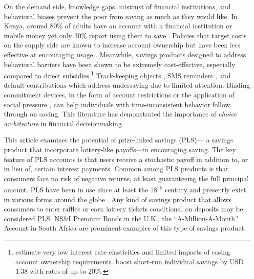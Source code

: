 \documentclass[11pt]{article}
\begin{document}
	On the demand side, knowledge gaps, mistrust of financial institutions, and behavioral biases prevent the poor from saving as much as they would like. In Kenya, around 80\% of adults have an account with a financial institution or mobile money yet only 30\% report using them to save \parencite{demirguc-kunt_global_2018}. Policies that target costs on the supply side are known to increase account ownership but have been less effective at encouraging usage \parencite{dupas_why_2013,karlan_banking_2016}. Meanwhile, savings products designed to address behavioral barriers have been shown to be extremely cost-effective, especially compared to direct subsidies.\footnote{\textcite{karlan_price_2018} estimate very low interest rate elasticities and limited impacts of easing account ownership requirements. \textcite{schaner_persistent_2018} boost short-run individual savings by USD 1.38 with rates of up to 20\%.} Track-keeping objects \parencite{akbas_how_2016}, SMS reminders \parencite{karlan_getting_2010}, and default contributions \parencite{thaler_save_2004,chetty_active_2014,somville_saving_2018} which address undersaving due to limited attention. Binding commitment devices, in the form of account restrictions \parencite{ashraf_tying_2006} or the application of social pressure \parencite{dupas_why_2013}, can help individuals with time-inconsistent behavior follow through on saving. This literature has demonstrated the importance of \textit{choice architecture} in financial decisionmaking.

	This article examines the potential of prize-linked savings (PLS)--- a savings product that incorporate lottery-like payoffs---in encouraging saving. The key feature of PLS accounts is that users receive a stochastic payoff in addition to, or in lieu of, certain interest payments. Common among PLS products is that consumers face no risk of negative returns, at least guaranteeing the full principal amount. PLS have been in use since at least the 18\textsuperscript{th} century and presently exist in various forms around the globe \parencite{murphy_lotteries_2005,kearney_making_2010}. Any kind of savings product that allows consumers to enter raffles or earn lottery tickets conditional on deposits may be considered PLS. NS\&I Premium Bonds in the U.K., the ``A-Million-A-Month'' Account in South Africa are prominent examples of this type of savings product.

\end{document}
